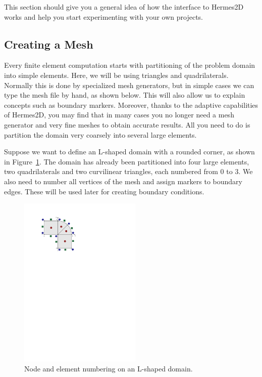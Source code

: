 
This section should give you a general idea of how the interface to Hermes2D works
and help you start experimenting with your own projects. 



\subsection{Creating a Mesh}

Every finite element computation starts with partitioning of the problem domain
into simple elements. Here, we will be using triangles and quadrilaterals.
Normally this is done by specialized mesh generators, but in simple cases we
can type the mesh file by hand, as shown below. This will also allow us to explain
concepts such as boundary markers. Moreover, thanks to the adaptive capabilities
of Hermes2D, you may find that in many cases you no longer need a mesh generator
and very fine meshes to obtain accurate results. All you need to do is partition
the domain very coarsely into several large elements.

Suppose we want to define an L-shaped domain with a rounded corner, as shown in
Figure~\ref{fig:simplemesh}. The domain has already been partitioned into four large
elements, two quadrilaterals and two curvilinear triangles, each numbered from 0 to 3.
We also need to number all vertices of the mesh and assign markers to boundary edges.
These will be used later for creating boundary conditions.

\begin{figure}[ht]
  \smallskip\centering
  \includegraphics[width=0.52\textwidth]{img/simplemesh}
  \caption{Node and element numbering on an L-shaped domain.}
  \label{fig:simplemesh}
\end{figure}


